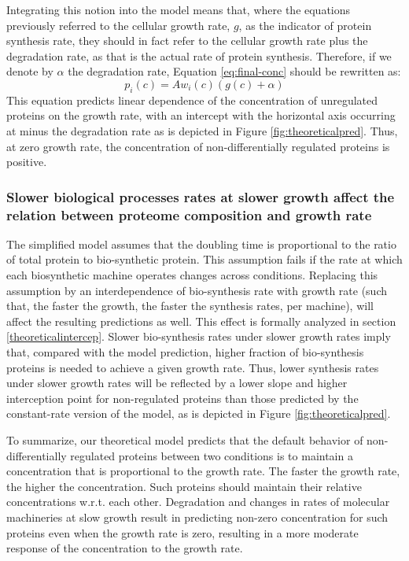 \documentclass[a4paper]{article}
\begin{document}
Integrating this notion into the model means that, where the equations previously referred to the cellular growth rate, $g$, as the indicator of protein synthesis rate, they should in fact refer to the cellular growth rate plus the degradation rate, as that is the actual rate of protein synthesis.
Therefore, if we denote by $\alpha$ the degradation rate, Equation \ref{eq:final-conc} should be rewritten as:
\begin{equation}
  \label{eq:final-conc-deg}
  p_i(c)=Aw_i(c)(g(c)+\alpha)
\end{equation}
This equation predicts linear dependence of the concentration of unregulated proteins on the growth rate, with an intercept with the horizontal axis occurring at minus the degradation rate as is depicted in Figure \ref{fig:theoreticalpred}.
Thus, at zero growth rate, the concentration of non-differentially regulated proteins is positive.

\subsubsection{Slower biological processes rates at slower growth affect the relation between proteome composition and growth rate}
\label{slowbiosynthesis}
The simplified model assumes that the doubling time is proportional to the ratio of total protein to bio-synthetic protein.
This assumption fails if the rate at which each biosynthetic machine operates changes across conditions.
Replacing this assumption by an interdependence of bio-synthesis rate with growth rate (such that, the faster the growth, the faster the synthesis rates, per machine)\cite{Bremer}, will affect the resulting predictions as well.
This effect is formally analyzed in section \ref{theoreticalintercep}.
Slower bio-synthesis rates under slower growth rates imply that, compared with the model prediction, higher fraction of bio-synthesis proteins is needed to achieve a given growth rate.
Thus, lower synthesis rates under slower growth rates will be reflected by a lower slope and higher interception point for non-regulated proteins than those predicted by the constant-rate version of the model, as is depicted in Figure \ref{fig:theoreticalpred}.

To summarize, our theoretical model predicts that the default behavior of non-differentially regulated proteins between two conditions is to maintain a concentration that is proportional to the growth rate.
The faster the growth rate, the higher the concentration.
Such proteins should maintain their relative concentrations w.r.t. each other.
Degradation and changes in rates of molecular machineries at slow growth result in predicting non-zero concentration for such proteins even when the growth rate is zero, resulting in a more moderate response of the concentration to the growth rate.
\end{document}
